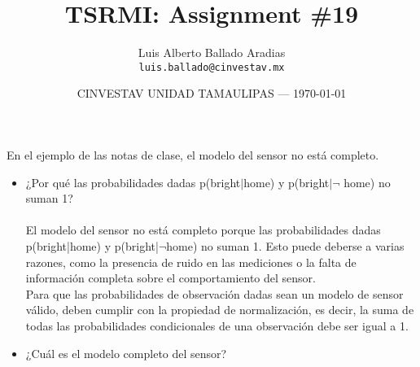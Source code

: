 \documentclass{article}
\title{TSRMI: Assignment \#19} %
\author{Luis Alberto Ballado Aradias\\ \texttt{luis.ballado@cinvestav.mx}} %
\date{CINVESTAV UNIDAD TAMAULIPAS --- \today} %
\begin{document}
\maketitle %


En el ejemplo de las notas de clase, el modelo del sensor no está completo. 

\begin{itemize}
\item ¿Por qué las probabilidades dadas p(bright$|$home) y p(bright$|\neg$ home) no suman 1? \\\\
  El modelo del sensor no está completo porque las probabilidades dadas p(bright|home) y p(bright|$\neg$home) no suman 1. Esto puede deberse a varias razones, como la presencia de ruido en las mediciones o la falta de información completa sobre el comportamiento del sensor.\\

  Para que las probabilidades de observación dadas sean un modelo de sensor válido, deben cumplir con la propiedad de normalización, es decir, la suma de todas las probabilidades condicionales de una observación debe ser igual a 1. %


  
\item ¿Cuál es el modelo completo del sensor?\\


\end{itemize}
\end{document}
